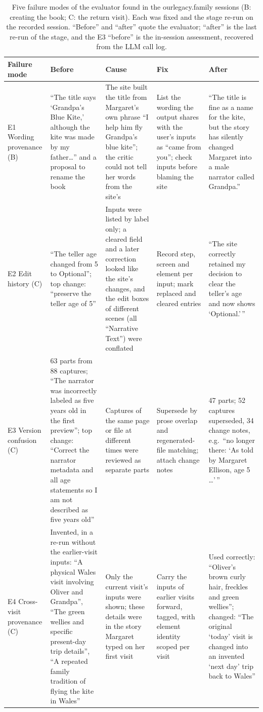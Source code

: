 \documentclass[10pt,twocolumn]{article}
\newcommand{\ol}{\textsf{ourlegacy.family}}
\begin{document}
\begin{table}[t]
\centering
\footnotesize
\caption{Five failure modes of the evaluator found in the \ol{} sessions (B: creating the book; C: the return visit). Each was fixed and the stage re-run on the recorded session. ``Before'' and ``after'' quote the evaluator; ``after'' is the last re-run of the stage, and the E3 ``before'' is the in-session assessment, recovered from the LLM call log.}
\label{tab:errors}
\begin{tabularx}{\textwidth}{@{}P{2.1cm}YYP{3.6cm}Y@{}}
\toprule
Failure mode & Before & Cause & Fix & After \\
\midrule
E1 Wording provenance (B) & ``The title says `Grandpa's Blue Kite,' although the kite was made by my father\ldots'' and a proposal to rename the book & The site built the title from Margaret's own phrase ``I help him fly Grandpa's blue kite''; the critic could not tell her words from the site's & List the wording the output shares with the user's inputs as ``came from you''; check inputs before blaming the site & ``The title is fine as a name for the kite, but the story has silently changed Margaret into a male narrator called Grandpa.'' \\
\addlinespace
E2 Edit history (C) & ``The teller age changed from 5 to Optional''; top change: ``preserve the teller age of 5'' & Inputs were listed by label only; a cleared field and a later correction looked like the site's changes, and the edit boxes of different scenes (all ``Narrative Text'') were conflated & Record step, screen and element per input; mark replaced and cleared entries & ``The site correctly retained my decision to clear the teller's age and now shows `Optional.'\,'' \\
\addlinespace
E3 Version confusion (C) & 63 parts from 88 captures; ``The narrator was incorrectly labeled as five years old in the first preview''; top change: ``Correct the narrator metadata and all age statements so I am not described as five years old'' & Captures of the same page or file at different times were reviewed as separate parts & Supersede by prose overlap and regenerated-file matching; attach change notes & 47 parts; 52 captures superseded, 34 change notes, e.g.\ ``no longer there: `As told by Margaret Ellison, age 5 \ldots'\,'' \\
\addlinespace
E4 Cross-visit provenance (C) & Invented, in a re-run without the earlier-visit inputs: ``A physical Wales visit involving Oliver and Grandpa'', ``The green wellies and specific present-day trip details'', ``A repeated family tradition of flying the kite in Wales'' & Only the current visit's inputs were shown; these details were in the story Margaret typed on her first visit & Carry the inputs of earlier visits forward, tagged, with element identity scoped per visit & Used correctly: ``Oliver's brown curly hair, freckles and green wellies''; changed: ``The original `today' visit is changed into an invented `next day' trip back to Wales'' \\

\end{tabularx}
\end{table}
\end{document}
